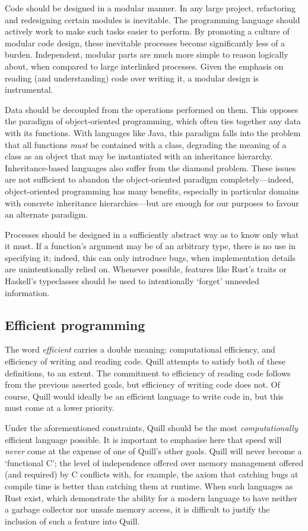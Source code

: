 \documentclass[UKenglish, 11pt, a4paper, parskip=half]{scrbook}
\begin{document}
Code should be designed in a modular manner.
In any large project, refactoring and redesigning certain modules is inevitable.
The programming language should actively work to make such tasks easier to perform.
By promoting a culture of modular code design, these inevitable processes become significantly less of a burden.
Independent, modular parts are much more simple to reason logically about, when compared to large interlinked processes.
Given the emphasis on reading (and understanding) code over writing it, a modular design is instrumental.

Data should be decoupled from the operations performed on them.
This opposes the paradigm of object-oriented programming, which often ties together any data with its functions.
With languages like Java, this paradigm falls into the problem that all functions \textit{must} be contained with a class, degrading the meaning of a class as an object that may be instantiated with an inheritance hierarchy.
Inheritance-based languages also suffer from the diamond problem.
These issues are not sufficient to abandon the object-oriented paradigm completely---indeed, object-oriented programming has many benefits, especially in particular domains with concrete inheritance hierarchies---but are enough for our purposes to favour an alternate paradigm.

Processes should be designed in a sufficiently abstract way as to know only what it must.
If a function's argument may be of an arbitrary type, there is no use in specifying it; indeed, this can only introduce bugs, when implementation details are unintentionally relied on.
Whenever possible, features like Rust's traits or Haskell's typeclasses should be used to intentionally `forget' unneeded information.

\subsection{Efficient programming}

The word \textit{efficient} carries a double meaning: computational efficiency, and efficiency of writing and reading code.
Quill attempts to satisfy both of these definitions, to an extent.
The commitment to efficiency of reading code follows from the previous asserted goals, but efficiency of writing code does not.
Of course, Quill would ideally be an efficient language to write code in, but this must come at a lower priority.

Under the aforementioned constraints, Quill should be the most \textit{computationally} efficient language possible.
It is important to emphasise here that speed will \textit{never} come at the expense of one of Quill's other goals.
Quill will never become a `functional C'; the level of independence offered over memory management offered (and required) by C conflicts with, for example, the axiom that catching bugs at compile time is better than catching them at runtime.
When such languages as Rust exist, which demonstrate the ability for a modern language to have neither a garbage collector nor unsafe memory access, it is difficult to justify the inclusion of such a feature into Quill.
\end{document}
